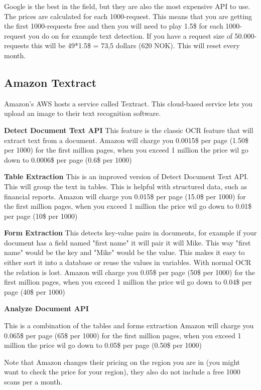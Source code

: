 Google is the best in the field, but they are also the most expensive API to use.
The prices are calculated for each 1000-request.
This means that you are getting the first 1000-requests free and then you will need to play 1.5\$ for each 1000-request you do on for example text detection.
If you have a request size of 50.000-requests this will be 49*1.5\$ = 73,5 dollars (620 NOK).
This will reset every month.

\subsection{Amazon Textract}\label{subsec:API_Amazon}

Amazon's AWS hosts a service called Textract.
This cloud-based service lets you upload an image to their text recognition software.

\textbf{Detect Document Text API}
This feature is the classic OCR feature that will extract text from a document.
Amazon will charge you 0.0015\$ per page (1.50\$ per 1000) for the first million pages, when you exceed 1 million the price wil go down to
0.0006\$ per page (0.6\$ per 1000)

\textbf{Table Extraction}
This is an improved version of Detect Document Text API. This will group the text in tables.
This is helpful with structured data, such as financial reports.
Amazon will charge you 0.015\$ per page (15.0\$ per 1000) for the first million pages, when you exceed 1 million the price wil go down to
0.01\$ per page (10\$ per 1000)

\textbf{Form Extraction}
This detects key-value pairs in documents, for example if your document has a field named "first name" it will pair it will Mike.
This way "first name" would be the key and "Mike" would be the value.
This makes it easy to either sort it into a database or reuse the values in variables.
With normal OCR the relation is lost.
Amazon will charge you 0.05\$ per page (50\$ per 1000) for the first million pages, when you exceed 1 million the price wil go down to
0.04\$ per page (40\$ per 1000)

\textbf{Analyze Document API}

This is a combination of the tables and forms extraction
Amazon will charge you 0.065\$ per page (65\$ per 1000) for the first million pages, when you exceed 1 million the price wil go down to
0.05\$ per page (0.50\$ per 1000)

Note that Amazon changes their pricing on the region you are in (you might want to check the price for your region), they also do not include a free 1000 scans per a month.

